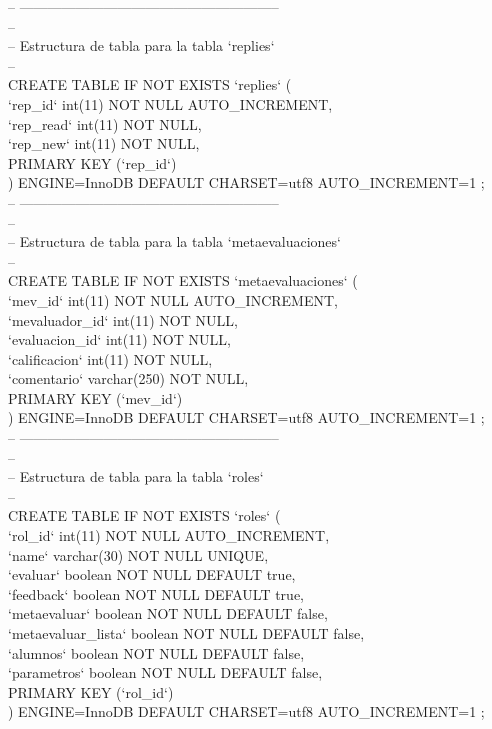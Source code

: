 -- --------------------------------------------------------\\

--\\
-- Estructura de tabla para la tabla `replies`\\
--\\

CREATE TABLE IF NOT EXISTS `replies` (\\
`rep\_id` int(11) NOT NULL AUTO\_INCREMENT,\\
`rep\_read` int(11) NOT NULL,\\
`rep\_new` int(11) NOT NULL,\\
PRIMARY KEY (`rep\_id`)\\
) ENGINE=InnoDB  DEFAULT CHARSET=utf8 AUTO\_INCREMENT=1 ;\\

-- --------------------------------------------------------\\

--\\
-- Estructura de tabla para la tabla `metaevaluaciones`\\
--\\

CREATE TABLE IF NOT EXISTS `metaevaluaciones` (\\
`mev\_id` int(11) NOT NULL AUTO\_INCREMENT,\\
`mevaluador\_id` int(11) NOT NULL,\\
`evaluacion\_id` int(11) NOT NULL,\\
`calificacion` int(11) NOT NULL,\\
`comentario` varchar(250) NOT NULL,\\
PRIMARY KEY (`mev\_id`)\\
) ENGINE=InnoDB  DEFAULT CHARSET=utf8 AUTO\_INCREMENT=1 ;\\

-- --------------------------------------------------------\\

--\\
-- Estructura de tabla para la tabla `roles`\\
--\\

CREATE TABLE IF NOT EXISTS `roles` (\\
`rol\_id` int(11) NOT NULL AUTO\_INCREMENT,\\
`name` varchar(30) NOT NULL UNIQUE,\\
`evaluar` boolean NOT NULL DEFAULT true,\\
`feedback` boolean NOT NULL DEFAULT true,\\
`metaevaluar` boolean NOT NULL DEFAULT false,\\
`metaevaluar\_lista` boolean NOT NULL DEFAULT false,\\
`alumnos` boolean NOT NULL DEFAULT false,\\
`parametros` boolean NOT NULL DEFAULT false,\\
PRIMARY KEY (`rol\_id`)\\
) ENGINE=InnoDB  DEFAULT CHARSET=utf8 AUTO\_INCREMENT=1 ;\\


